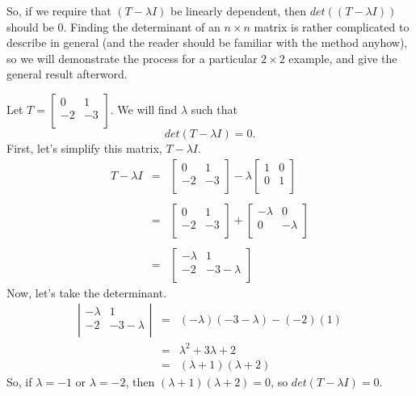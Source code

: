 \documentclass[letterpaper]{article}
\begin{document}
So, if we require that $(T-\lambda I)$ be linearly dependent, then $det((T-\lambda I))$ should be $0$. Finding the determinant of an $n \times n$ matrix is rather complicated to describe in general (and the reader should be familiar with the method anyhow), so we will demonstrate the process for a particular $2 \times 2$ example, and give the general result afterword. 

\begin{example}
Let $T =
\left[ \begin{array}{cc}
0 & 1 \\
-2 & -3 \\
\end{array} \right]
$.
We will find $\lambda$ such that $$det(T-\lambda I) = 0.$$
First, let's simplify this matrix, $T-\lambda I$. 
\[
\begin{array}{ccl}
T - \lambda I & = &
\left[ \begin{array}{cc}
0 & 1 \\
-2 & -3 \\
\end{array} \right]
- \lambda 
\left[ \begin{array}{cc}
1 & 0 \\
0 & 1 \\
\end{array} \right] \\
\\
& = &
\left[ \begin{array}{cc}
0 & 1 \\
-2 & -3 \\
\end{array} \right]
+ 
\left[ \begin{array}{cc}
-\lambda & 0 \\
0 & -\lambda \\
\end{array} \right]\\
\\
& = &
\left[ \begin{array}{cc}
-\lambda & 1 \\
-2 & -3-\lambda \\
\end{array} \right]
\end{array}
\]
Now, let's take the determinant. 
\[
\begin{array}{ccl}
\left| \begin{array}{cc}
-\lambda & 1 \\
-2 & -3-\lambda \\
\end{array} \right|
& = & 
(-\lambda)(-3-\lambda)-(-2)(1) \\
%
& = & 
\lambda^2+3\lambda+2 \\
%
& = & 
(\lambda+1)(\lambda+2)
\end{array}
\]
So, if $\lambda = -1$ or $\lambda = -2$, then $(\lambda+1)(\lambda+2)=0$, so $det(T-\lambda I) = 0.$
\qedwhite
\end{example}
\end{document}
